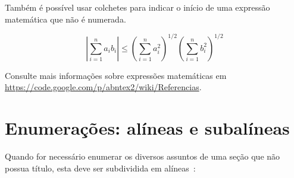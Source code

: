 Também é possível usar colchetes para indicar o início de uma expressão
matemática que não é numerada.

\[
\left|\sum_{i=1}^n {a_i}{b_i}\right|
\le
\left(\sum_{i=1}^n a_i^2\right)^{1/2}
\left(\sum_{i=1}^n b_i^2\right)^{1/2}
\]

Consulte mais informações sobre expressões matemáticas em
\url{https://code.google.com/p/abntex2/wiki/Referencias}.

\section{Enumerações: alíneas e subalíneas}

Quando for necessário enumerar
os diversos assuntos de uma seção que não possua título, esta deve ser
subdividida em alíneas~\cite[4.2]{NBR6024:2012}:

